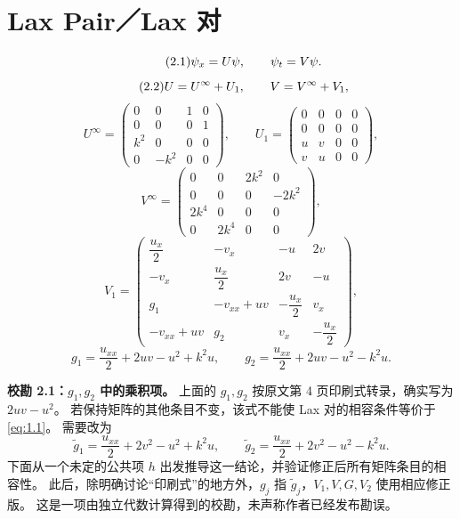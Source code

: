 \section{Lax Pair／Lax 对}

\begin{equation}
\originaleq{2.1}
\psi_x=U\psi,\qquad \psi_t=V\psi.
\end{equation}
\begin{equation}
\originaleq{2.2}
U=U^\infty+U_1,\qquad V=V^\infty+V_1,
\end{equation}
\[
U^\infty=\begin{pmatrix}
0&0&1&0\\0&0&0&1\\k^2&0&0&0\\0&-k^2&0&0
\end{pmatrix},\qquad
U_1=\begin{pmatrix}
0&0&0&0\\0&0&0&0\\u&v&0&0\\v&u&0&0
\end{pmatrix},
\]
\[
V^\infty=\begin{pmatrix}
0&0&2k^2&0\\0&0&0&-2k^2\\2k^4&0&0&0\\0&2k^4&0&0
\end{pmatrix},
\]
\[
V_1=\begin{pmatrix}
\dfrac{u_x}{2}&-v_x&-u&2v\\
-v_x&\dfrac{u_x}{2}&2v&-u\\
g_1&-v_{xx}+uv&-\dfrac{u_x}{2}&v_x\\
-v_{xx}+uv&g_2&v_x&-\dfrac{u_x}{2}
\end{pmatrix},
\]
\[
g_1=\dfrac{u_{xx}}{2}+2uv-u^2+k^2u,\qquad
g_2=\dfrac{u_{xx}}{2}+2uv-u^2-k^2u.
\]


\begin{note}
\textbf{校勘 2.1：$g_1,g_2$ 中的乘积项。}
上面的 $g_1,g_2$ 按原文第 4 页印刷式转录，确实写为 $2uv-u^2$。
若保持矩阵的其他条目不变，该式不能使 Lax 对的相容条件等价于 \eqref{eq:1.1}。
需要改为
\[
\widetilde g_1=\dfrac{u_{xx}}{2}+2v^2-u^2+k^2u,\qquad
\widetilde g_2=\dfrac{u_{xx}}{2}+2v^2-u^2-k^2u.
\]
下面从一个未定的公共项 $h$ 出发推导这一结论，并验证修正后所有矩阵条目的相容性。
此后，除明确讨论“印刷式”的地方外，$g_j$ 指 $\widetilde g_j$，$V_1,V,G,V_2$ 使用相应修正版。
这是一项由独立代数计算得到的校勘，未声称作者已经发布勘误。
\end{note}


